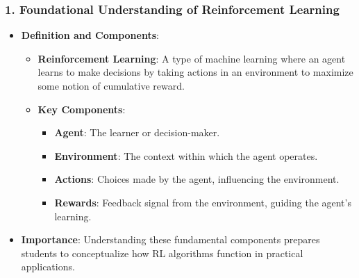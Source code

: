\documentclass[aspectratio=169]{beamer}
\begin{document}
\begin{frame}[fragile]
    \frametitle{1. Foundational Understanding of Reinforcement Learning}
    \begin{itemize}
        \item \textbf{Definition and Components}:
        \begin{itemize}
            \item \textbf{Reinforcement Learning}: A type of machine learning where an agent learns to make decisions by taking actions in an environment to maximize some notion of cumulative reward.
            \item \textbf{Key Components}:
            \begin{itemize}
                \item \textbf{Agent}: The learner or decision-maker.
                \item \textbf{Environment}: The context within which the agent operates.
                \item \textbf{Actions}: Choices made by the agent, influencing the environment.
                \item \textbf{Rewards}: Feedback signal from the environment, guiding the agent's learning.
            \end{itemize}
        \end{itemize}
        \item \textbf{Importance}: Understanding these fundamental components prepares students to conceptualize how RL algorithms function in practical applications.
    \end{itemize}
\end{frame}
\end{document}
